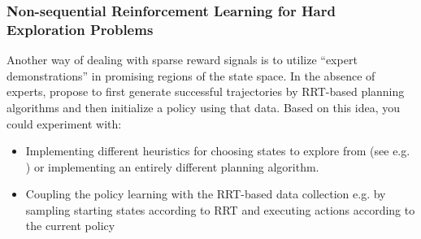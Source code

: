 \documentclass[a4paper]{article}
\begin{document}
\subsubsection{Non-sequential Reinforcement Learning for Hard Exploration Problems}
Another way of dealing with sparse reward signals is to utilize ``expert demonstrations'' in promising regions of the state space. In the absence of experts, \citet{blau2021learning} propose to first generate successful trajectories by RRT-based planning algorithms and then initialize a policy using that data. Based on this idea, you could experiment with:
\begin{itemize}
  \item Implementing different heuristics for choosing states to explore from (see e.g. \citet{ecoffet2019go}) or implementing an entirely different planning algorithm.
  \item Coupling the policy learning with the RRT-based data collection e.g. by sampling starting states according to RRT and executing actions according to the current policy
\end{itemize}


%
\end{document}
